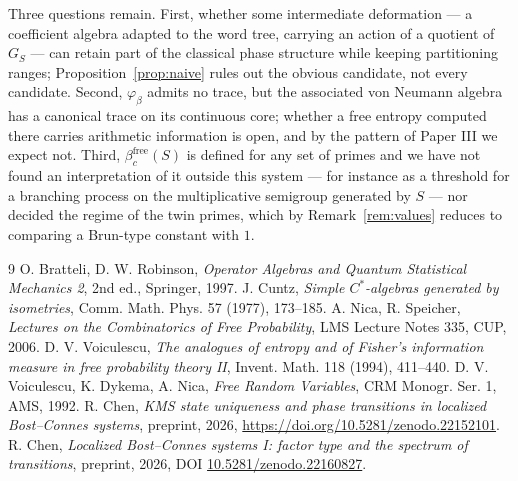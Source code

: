 \documentclass[11pt]{amsart}
\numberwithin{equation}{section}
\theoremstyle{definition}
\theoremstyle{remark}
\newcommand{\bfree}{\beta_c^{\mathrm{free}}}
\begin{document}
Three questions remain. First, whether some intermediate deformation --- a coefficient
algebra adapted to the word tree, carrying an action of a quotient of $G_S$ --- can retain
part of the classical phase structure while keeping partitioning ranges; Proposition~\ref{prop:naive}
rules out the obvious candidate, not every candidate. Second, $\varphi_\beta$ admits no
trace, but the associated von Neumann algebra has a canonical trace on its continuous core;
whether a free entropy computed there carries arithmetic information is open, and by the
pattern of Paper III we expect not. Third, $\bfree(S)$ is defined
for any set of primes and we have not found an interpretation of it outside this system ---
for instance as a threshold for a branching process on the multiplicative semigroup generated
by $S$ --- nor decided the regime of the twin primes, which by Remark~\ref{rem:values}
reduces to comparing a Brun-type constant with $1$.

\begin{thebibliography}{9}
 O. Bratteli, D. W. Robinson, \emph{Operator Algebras and Quantum Statistical Mechanics 2}, 2nd ed., Springer, 1997.
 J. Cuntz, \emph{Simple $C^*$-algebras generated by isometries}, Comm. Math. Phys. 57 (1977), 173--185.
 A. Nica, R. Speicher, \emph{Lectures on the Combinatorics of Free Probability}, LMS Lecture Notes 335, CUP, 2006.
 D. V. Voiculescu, \emph{The analogues of entropy and of Fisher's information measure in free probability theory II}, Invent. Math. 118 (1994), 411--440.
 D. V. Voiculescu, K. Dykema, A. Nica, \emph{Free Random Variables}, CRM Monogr. Ser. 1, AMS, 1992.
 R. Chen, \emph{KMS state uniqueness and phase transitions in localized Bost--Connes systems}, preprint, 2026, \newline\url{https://doi.org/10.5281/zenodo.22152101}.
 R. Chen, \emph{Localized Bost--Connes systems I: factor type and the spectrum of transitions}, preprint, 2026, DOI \href{https://doi.org/10.5281/zenodo.22160827}{10.5281/zenodo.22160827}.
\end{thebibliography}
\end{document}
